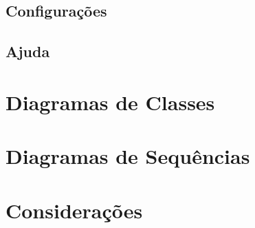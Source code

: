 \subsection{Configurações}
\subsection{Ajuda}

\section{Diagramas de Classes}

\section{Diagramas de Sequências}
\section{Considerações}
